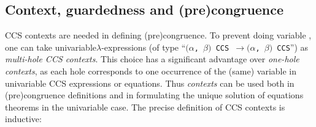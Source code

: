 \documentclass[GCNS]{yincog}
\renewcommand{\HOLinline}[1]{\mbox{\textup{\texttt{#1}}}}
\renewcommand{\HOLTyOp}[1]{\texttt{#1}}
\theoremstyle{remark}
\theoremstyle{theorem}
\theoremstyle{remark}
\newcommand{\HOLTokenTransEnd}{$\rightarrow$\xspace}
\newcommand{\univariate}{univariable\xspace}
\begin{document}
\subsection{Context, guardedness and (pre)congruence}
 \label{sscontext}

CCS contexts are needed in defining (pre)congruence. To prevent doing variable
, one can take \univariate $\lambda $-expressions (of type
``\HOLinline{\ensuremath{(}\ensuremath{\alpha}, \ensuremath{\beta}\ensuremath{)} \HOLTyOp{CCS} \HOLTokenTransEnd \ensuremath{(}\ensuremath{\alpha}, \ensuremath{\beta}\ensuremath{)} \HOLTyOp{CCS}}'')
as \emph{multi-hole CCS contexts}. This choice has a significant advantage
over \emph{one-hole contexts}, as each hole corresponds to one occurrence
of the (same) variable in \univariate CCS expressions or equations. Thus
\emph{contexts} can be used both in (pre)congruence definitions and in formulating
the unique solution of equations theorems in the \univariate case. The
precise definition of CCS contexts is inductive:
%
\end{document}
